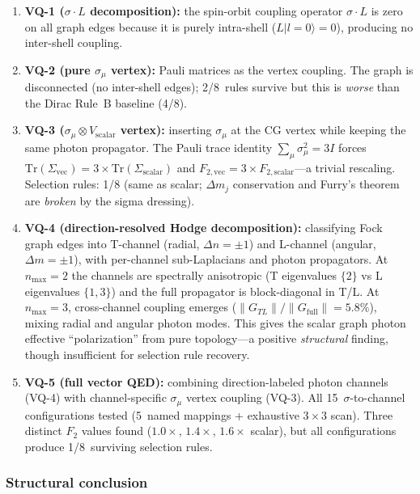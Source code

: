\documentclass[11pt]{article}
\begin{document}
\begin{enumerate}
\item \textbf{VQ-1 ($\sigma \cdot L$ decomposition):} the spin-orbit
  coupling operator $\sigma \cdot L$ is zero on all graph edges because
  it is purely intra-shell ($L|l{=}0\rangle = 0$), producing no
  inter-shell coupling.
\item \textbf{VQ-2 (pure $\sigma_\mu$ vertex):} Pauli matrices as the
  vertex coupling.  The graph is disconnected (no inter-shell edges);
  2/8~rules survive but this is \emph{worse} than the Dirac Rule~B
  baseline (4/8).
\item \textbf{VQ-3 ($\sigma_\mu \otimes V_{\mathrm{scalar}}$ vertex):}
  inserting $\sigma_\mu$ at the CG vertex while keeping the same photon
  propagator.  The Pauli trace identity
  $\sum_\mu \sigma_\mu^2 = 3I$ forces
  $\mathrm{Tr}(\Sigma_{\mathrm{vec}}) = 3 \times
  \mathrm{Tr}(\Sigma_{\mathrm{scalar}})$ and
  $F_{2,\mathrm{vec}} = 3 \times F_{2,\mathrm{scalar}}$---a trivial
  rescaling.  Selection rules: 1/8 (same as scalar; $\Delta m_j$
  conservation and Furry's theorem are \emph{broken} by the sigma
  dressing).
\item \textbf{VQ-4 (direction-resolved Hodge decomposition):} classifying
  Fock graph edges into T-channel (radial, $\Delta n = \pm 1$) and
  L-channel (angular, $\Delta m = \pm 1$), with per-channel sub-Laplacians
  and photon propagators.  At $n_{\max} = 2$ the channels are spectrally
  anisotropic (T eigenvalues $\{2\}$ vs L eigenvalues $\{1, 3\}$) and the
  full propagator is block-diagonal in T/L.  At $n_{\max} = 3$,
  cross-channel coupling emerges ($\|G_{TL}\|/\|G_{\mathrm{full}}\| = 5.8\%$),
  mixing radial and angular photon modes.  This gives the scalar graph
  photon effective ``polarization'' from pure topology---a positive
  \emph{structural} finding, though insufficient for selection rule recovery.
\item \textbf{VQ-5 (full vector QED):} combining direction-labeled photon
  channels (VQ-4) with channel-specific $\sigma_\mu$ vertex coupling (VQ-3).
  All 15~$\sigma$-to-channel configurations tested (5~named mappings +
  exhaustive $3 \times 3$ scan).  Three distinct $F_2$ values found
  ($1.0\times$, $1.4\times$, $1.6\times$ scalar), but all configurations
  produce 1/8~surviving selection rules.
\end{enumerate}

\subsubsection{Structural conclusion}
\end{document}
